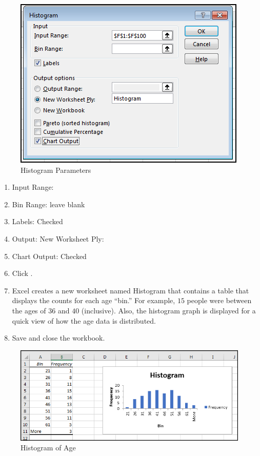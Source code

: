 \begin{figure}[H]
	\centering
	\includegraphics[width=\maxwidth{.75\linewidth}]{gfx/ch09_fig62}
	\caption{Histogram Parameters}
	\label{09:fig62}
\end{figure}

\begin{enumerate}[resume]
	\item Input Range: 
	\item Bin Range: leave blank
	\item Labels: Checked
	\item Output: New Worksheet Ply: 
	\item Chart Output: Checked
	\item Click .
	\item Excel creates a new worksheet named Histogram that contains a table that displays the counts for each age ``bin.'' For example, $ 15 $ people were between the ages of $ 36 $ and $ 40 $ (inclusive). Also, the histogram graph is displayed for a quick view of how the age data is distributed.
	\item Save and close the  workbook.
\end{enumerate}

\begin{figure}[H]
	\centering
	\includegraphics[width=\maxwidth{.95\linewidth}]{gfx/ch09_fig63}
	\caption{Histogram of Age}
	\label{09:fig63}
\end{figure}

